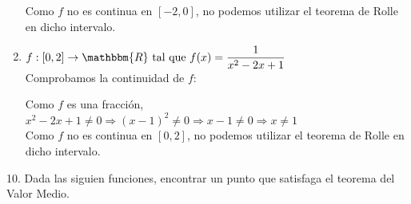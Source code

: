 \documentclass[12pt]{article}
\begin{document}
\begin{enumerate}[\hspace{9px} a)]
        Como $f$ no es continua en $[-2,0]$, no podemos utilizar el teorema de Rolle en dicho intervalo.\\

    \item \(f: [0,2] \rightarrow \mathbbm{R} \ \text{tal que} \ f(x)=\displaystyle\frac{1}{x^2-2x+1}\)\\

        Comprobamos la continuidad de $f$:

        Como $f$ es una fracción, \(x^2-2x+1 \neq 0 \Rightarrow (x-1)^2 \neq 0 \Rightarrow x-1\neq0 \Rightarrow x\neq1\)\\

        Como $f$ no es continua en $[0,2]$, no podemos utilizar el teorema de Rolle en dicho intervalo.\\

\end{enumerate}
\medskip
10. Dada las siguien funciones, encontrar un punto que satisfaga el teorema del Valor Medio.
\end{document}
